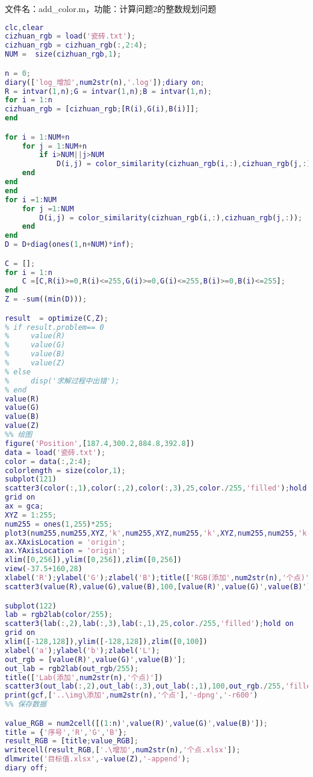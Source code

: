 文件名：add\_color.m，功能：计算问题2的整数规划问题

\begin{lstlisting}[language=matlab]
clc,clear
cizhuan_rgb = load('瓷砖.txt');
cizhuan_rgb = cizhuan_rgb(:,2:4);
NUM =  size(cizhuan_rgb,1);

n = 0;
diary(['log_增加',num2str(n),'.log']);diary on;
R = intvar(1,n);G = intvar(1,n);B = intvar(1,n);
for i = 1:n
cizhuan_rgb = [cizhuan_rgb;[R(i),G(i),B(i)]];
end

for i = 1:NUM+n
	for j = 1:NUM+n
		if i>NUM||j>NUM
			D(i,j) = color_similarity(cizhuan_rgb(i,:),cizhuan_rgb(j,:));
	end
end
end
for i =1:NUM
	for j =1:NUM
		D(i,j) = color_similarity(cizhuan_rgb(i,:),cizhuan_rgb(j,:));
	end
end
D = D+diag(ones(1,n+NUM)*inf);

C = [];
for i = 1:n
	C =[C,R(i)>=0,R(i)<=255,G(i)>=0,G(i)<=255,B(i)>=0,B(i)<=255];
end
Z = -sum((min(D)));

result  = optimize(C,Z);
% if result.problem== 0
%     value(R)
%     value(G)
%     value(B)
%     value(Z)
% else
%     disp('求解过程中出错');
% end
value(R)
value(G)
value(B)
value(Z)
%% 绘图
figure('Position',[187.4,300.2,884.8,392.8])
data = load('瓷砖.txt');
color = data(:,2:4);
colorlength = size(color,1);
subplot(121)
scatter3(color(:,1),color(:,2),color(:,3),25,color./255,'filled');hold on
grid on
ax = gca;
XYZ = 1:255;
num255 = ones(1,255)*255;
plot3(num255,num255,XYZ,'k',num255,XYZ,num255,'k',XYZ,num255,num255,'k');hold on
ax.XAxisLocation = 'origin';
ax.YAxisLocation = 'origin';
xlim([0,256]),ylim([0,256]),zlim([0,256])
view(-37.5+160,28)
xlabel('R');ylabel('G');zlabel('B');title(['RGB(添加',num2str(n),'个点)'])
scatter3(value(R),value(G),value(B),100,[value(R)',value(G)',value(B)']/255,'filled')

subplot(122)
lab = rgb2lab(color/255);
scatter3(lab(:,2),lab(:,3),lab(:,1),25,color./255,'filled');hold on
grid on
xlim([-128,128]),ylim([-128,128]),zlim([0,100])
xlabel('a');ylabel('b');zlabel('L');
out_rgb = [value(R)',value(G)',value(B)'];
out_lab = rgb2lab(out_rgb/255);
title(['Lab(添加',num2str(n),'个点)'])
scatter3(out_lab(:,2),out_lab(:,3),out_lab(:,1),100,out_rgb./255,'filled');
print(gcf,['..\img\添加',num2str(n),'个点'],'-dpng','-r600')
%% 保存数据

value_RGB = num2cell([(1:n)',value(R)',value(G)',value(B)']);
title = {'序号','R','G','B'};
result_RGB = [title;value_RGB];
writecell(result_RGB,['.\增加',num2str(n),'个点.xlsx']);
dlmwrite('目标值.xlsx',-value(Z),'-append');
diary off;

\end{lstlisting}


